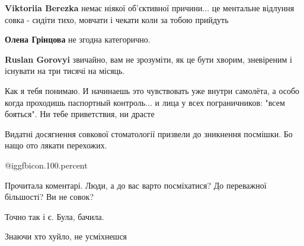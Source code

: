 \begin{itemize}
\begin{itemize}
\textbf{Viktoriia Berezka} немає ніякої об’єктивної причини... це ментальне відлуння совка - сидіти тихо, мовчати і чекати коли за тобою прийдуть

\textbf{Олена Грінцова} не згодна категорично.

\textbf{Ruslan Gorovyi} звичайно, вам не зрозуміти, як це бути хворим, зневіреним і існувати на три тисячі на місяць.
\end{itemize} %


Как я тебя понимаю. И начинаешь это чувствовать уже внутри самолёта, а особо
когда проходишь паспортный контроль... и лица у всех пограничников: "всем
бояться". Ни тебе приветствия, ни драсте

Видатні досягнення совкової стоматології призвели до зникнення посмішки. Бо нащо ото лякати перехожих.

 @igg{fbicon.100.percent} 

Прочитала коментарі. Люди, а до вас варто посміхатися? До переважної більшості? Ви не совок?

Точно так і є. Була, бачила.

Знаючи хто хуйло, не усміхнешся


\end{itemize} %
